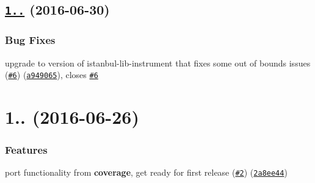 \label{_1.0.1}%
 \subsection*{\href{https://github.com/istanbuljs/babel-plugin-istanbul/compare/v1.0.0...v1.0.1}{\tt 1..} (2016-\/06-\/30)}

\subsubsection*{Bug Fixes}


\begin{DoxyItemize}
\item upgrade to version of istanbul-\/lib-\/instrument that fixes some out of bounds issues (\href{https://github.com/istanbuljs/babel-plugin-istanbul/issues/6}{\tt \#6}) (\href{https://github.com/istanbuljs/babel-plugin-istanbul/commit/a949065}{\tt a949065}), closes \href{https://github.com/istanbuljs/babel-plugin-istanbul/issues/6}{\tt \#6}
\end{DoxyItemize}

\label{_1.0.0}%
 \section*{1.. (2016-\/06-\/26)}

\subsubsection*{Features}


\begin{DoxyItemize}
\item port functionality from {\bfseries coverage}, get ready for first release (\href{https://github.com/istanbuljs/babel-plugin-istanbul/issues/2}{\tt \#2}) (\href{https://github.com/istanbuljs/babel-plugin-istanbul/commit/2a8ee44}{\tt 2a8ee44}) 
\end{DoxyItemize}